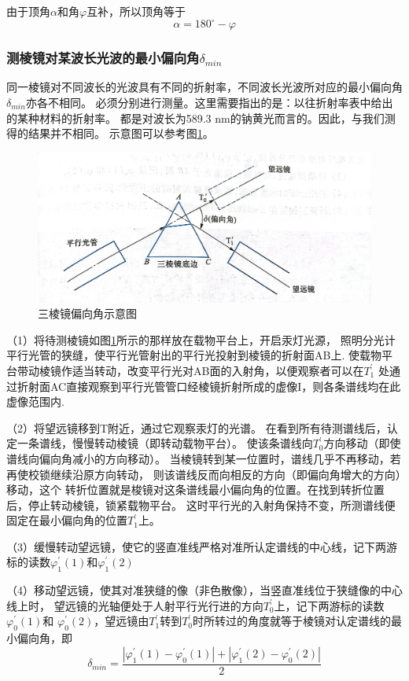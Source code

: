 \documentclass{ctexart}
\begin{document}
    由于顶角$\alpha$和角$\varphi$互补，所以顶角等于
    \begin{equation}
      \alpha=180^{\circ}-\varphi
    \end{equation}

    \subsubsection{测棱镜对某波长光波的最小偏向角$\delta_{min}$}
    同一棱镜对不同波长的光波具有不同的折射率，不同波长光波所对应的最小偏向角$\delta_{min}$亦各不相同。
    必须分别进行测量。这里需要指出的是：以往折射率表中给出的某种材料的折射率。
    都是对波长为589.3 nm的钠黄光而言的。因此，与我们测得的结果并不相同。
    示意图可以参考图\ref{pianxiangjiao}。
    \begin{figure}[H]
      \centering
      \includegraphics[height=0.3\textwidth,width=1\textwidth]{pianxiangjiaoshiyi.jpg}
      \caption{三棱镜偏向角示意图}\label{pianxiangjiao}
    \end{figure}
    （1）将待测棱镜如图\ref{pianxiangjiao}所示的那样放在载物平台上，开启汞灯光源，
    照明分光计平行光管的狭缝，使平行光管射出的平行光投射到棱镜的折射面AB上.
    使载物平台带动棱镜作适当转动，改变平行光对AB面的入射角，以便观察者可以在$T_{1}^{'}$
    处通过折射面AC直接观察到平行光管管口经棱镜折射所成的虚像I，则各条谱线均在此虚像范围内.

    （2）将望远镜移到T附近，通过它观察汞灯的光谱。
    在看到所有待测谱线后，认定一条谱线，慢慢转动棱镜（即转动载物平台）。
    使该条谱线向$T_{0}^{'}$方向移动（即使谱线向偏向角减小的方向移动）。
    当棱镜转到某一位置时，谱线几乎不再移动，若再使校锁继续沿原方向转动，
    则该谱线反而向相反的方向（即偏向角增大的方向）移动，这个
    转折位置就是梭镜对这条谱线最小偏向角的位置。在找到转折位置后，停止转动棱镜，锁紧载物平台。
    这时平行光的入射角保持不变，所测谱线便固定在最小偏向角的位置$T_{1}^{'}$上。

    （3）缓慢转动望远镜，使它的竖直准线严格对准所认定谱线的中心线，记下两游标的读数$\varphi_{1}^{'}(1)$和$\varphi_{1}^{'}(2)$

    （4）移动望远镜，使其对准狭缝的像（非色散像），当竖直准线位于狭缝像的中心线上时，
    望远镜的光轴便处于人射平行光行进的方向$T_{0}^{'}$上，记下两游标的读数$\varphi_{0}^{'}(1)$和
    $\varphi_{0}^{'}(2)$，望远镜由$T_{1}^{'}$转到$T_{0}^{'}$时所转过的角度就等于棱镜对认定谱线的最小偏向角，即
    \begin{equation}
      \delta_{min}=\frac{|\varphi_{1}^{'}(1)-\varphi_{0}^{'}(1)|+|\varphi_{1}^{'}(2)-\varphi_{0}^{'}(2)|}{2}
    \end{equation}
\end{document}

